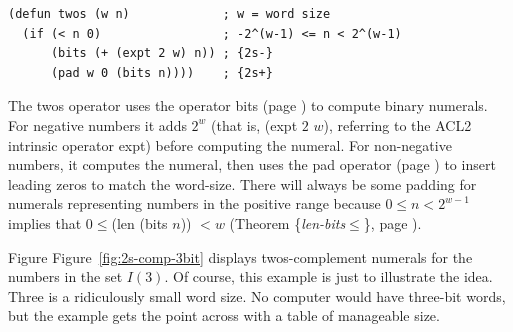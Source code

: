\label{twos-defun}
\begin{Verbatim}
(defun twos (w n)             ; w = word size
  (if (< n 0)                 ; -2^(w-1) <= n < 2^(w-1)
      (bits (+ (expt 2 w) n)) ; {2s-}
      (pad w 0 (bits n))))    ; {2s+}
\end{Verbatim}

The twos operator uses the operator bits (page \pageref{bits-defun})
to compute binary numerals.
For negative numbers it adds $2^w$
(that is, (expt $2$ $w$), referring to the ACL2 intrinsic operator expt)
before computing the numeral.
For non-negative numbers, it computes the numeral,
then uses the pad operator (page \pageref{pad-defun})
to insert leading zeros to match the word-size.
There will always be some padding for numerals representing
numbers in the positive range because
$0 \le n < 2^{w-1}$ implies that
$0 \le $(len (bits $n$)) $< w$
(Theorem \{\emph{len-bits}$\le$\}, page \pageref{len-bitsLE}).

Figure Figure~\ref{fig:2s-comp-3bit} displays
twos-complement numerals for the numbers in the set $I(3)$.
Of course, this example is just to illustrate the idea.
Three is a ridiculously small word size.
No computer would have three-bit words,
but the example gets the point across with a table of manageable size.

